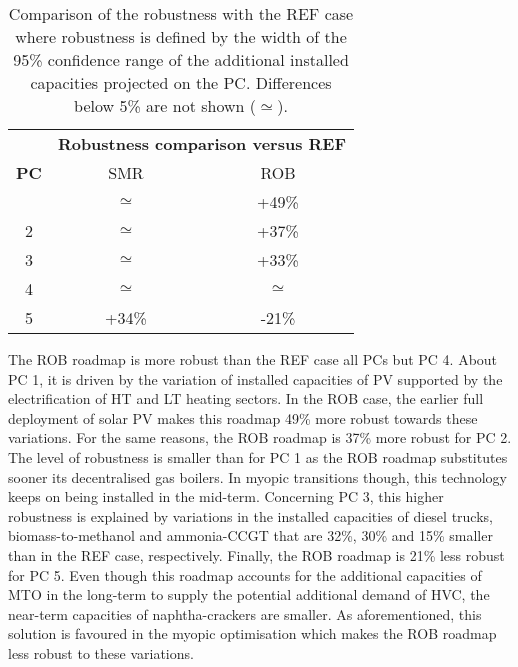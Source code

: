 \begin{table}[htbp!]
\caption{Comparison of the robustness with the REF case where robustness is defined by the width of the 95\% confidence range of the additional installed capacities projected on the PC. Differences below 5\% are not shown ($\simeq$).}
\label{tab:projection}
\centering
\begin{tabular}{c| c c}
\toprule
\multirow{3}{*}{\textbf{PC}} & \multicolumn{2}{c}{\textbf{Robustness comparison versus REF}}\\
& SMR & ROB \\
\midrule
1 & $\simeq$ & +49\% \\
2 &  $\simeq$ & +37\%\\
3 &  $\simeq$ & +33\%\\
4 & $\simeq$ & $\simeq$ \\
5 &  +34\% & -21\%\\

\bottomrule							

\end{tabular}
\end{table}

The ROB roadmap is more robust than the REF case all PCs but PC 4. About PC 1, it is driven by the variation of installed capacities of \gls{PV} supported by the electrification of \gls{HT} and \gls{LT} heating sectors. In the ROB case, the earlier full deployment of solar \gls{PV} makes this roadmap 49\% more robust towards these variations. For the same reasons, the ROB roadmap is 37\% more robust for PC 2. The level of robustness is smaller than for PC 1 as the ROB roadmap substitutes sooner its decentralised gas boilers. In myopic transitions though, this technology keeps on being installed in the mid-term. Concerning PC 3, this higher robustness is explained by variations in the installed capacities of diesel trucks, biomass-to-methanol and ammonia-\gls{CCGT} that are 32\%, 30\% and 15\% smaller than in the REF case, respectively.  Finally, the ROB roadmap is 21\% less robust for PC 5. Even though this roadmap accounts for the additional capacities of \gls{MTO} in the long-term to supply the potential additional demand of \gls{HVC}, the near-term capacities of naphtha-crackers are smaller. As aforementioned, this solution is favoured in the myopic optimisation which makes the ROB roadmap less robust to these variations.

